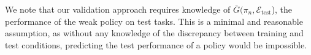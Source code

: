 We note that our validation approach requires knowledge of $\bar G(\pi_n, \mathcal{E}_{\textrm{test}}$), the performance of the weak policy on test tasks.
This is a minimal and reasonable assumption, as without any knowledge of the discrepancy between training and test conditions, predicting the test performance of a policy would be impossible.



